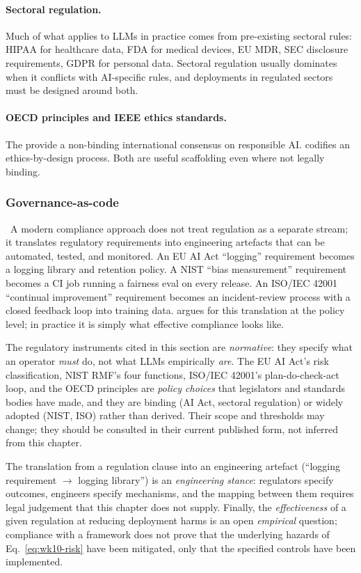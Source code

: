 \paragraph{Sectoral regulation.} Much of what applies to LLMs in
practice comes from pre-existing sectoral rules: HIPAA for
healthcare data, FDA for medical devices, EU MDR, SEC disclosure
requirements, GDPR for personal data. Sectoral regulation
usually dominates when it conflicts with AI-specific rules, and
deployments in regulated sectors must be designed around both.

\paragraph{OECD principles and IEEE ethics standards.} The
\citet{oecd_ai_principles} provide a non-binding international
consensus on responsible AI. \citet{ieee_7000} codifies an
ethics-by-design process. Both are useful scaffolding even where
not legally binding.

\subsubsection{Governance-as-code}

\Norm\ A modern compliance approach does not treat regulation as
a separate stream; it translates regulatory requirements into
engineering artefacts that can be automated, tested, and
monitored. An EU AI Act ``logging'' requirement becomes a
logging library and retention policy. A NIST ``bias measurement''
requirement becomes a CI job running a fairness eval on every
release. An ISO/IEC 42001 ``continual improvement'' requirement
becomes an incident-review process with a closed feedback loop
into training data. \citet{anderljung2023frontier} argues for
this translation at the policy level; in practice it is simply
what effective compliance looks like.

\begin{provedassumed}
The regulatory instruments cited in this section are
\emph{normative}: they specify what an operator \emph{must} do,
not what LLMs empirically \emph{are}. The EU AI Act's risk
classification, NIST RMF's four functions, ISO/IEC 42001's
plan-do-check-act loop, and the OECD principles are
\emph{policy choices} that legislators and standards bodies have
made, and they are binding (AI Act, sectoral regulation) or
widely adopted (NIST, ISO) rather than derived. Their scope and
thresholds may change; they should be consulted in their current
published form, not inferred from this chapter.

The translation from a regulation clause into an engineering
artefact (``logging requirement $\to$ logging library'')
is an \emph{engineering stance}: regulators specify outcomes,
engineers specify mechanisms, and the mapping between them
requires legal judgement that this chapter does not supply.
Finally, the \emph{effectiveness} of a given regulation at
reducing deployment harms is an open \emph{empirical} question;
compliance with a framework does not prove that the underlying
hazards of Eq.~\eqref{eq:wk10-risk} have been mitigated, only
that the specified controls have been implemented.
\end{provedassumed}

